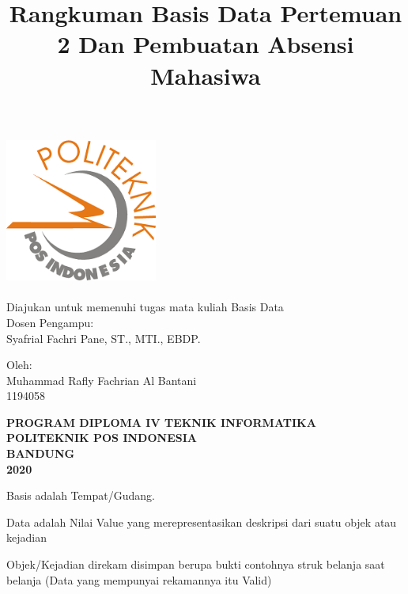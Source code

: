 \documentclass[12pt]{article}
\title{Rangkuman Basis Data Pertemuan 2 Dan Pembuatan Absensi Mahasiwa}
\date{}
\begin{document}
\begin{titlepage}
\maketitle
\thispagestyle{empty}

\vspace{0.5cm}
\begin{center}
\includegraphics[width=5cm, height=5cm]{poltekpos.png}
\end{center}
\vspace{0.5cm}
\begin{center}
Diajukan untuk memenuhi tugas mata kuliah Basis Data\\
\vspace{12px}
Dosen Pengampu:\\
Syafrial Fachri Pane, ST., MTI., EBDP.
\vspace{12px}

Oleh:\\
Muhammad Rafly Fachrian Al Bantani\\
1194058
\vspace{14px}

\textbf{PROGRAM DIPLOMA IV TEKNIK INFORMATIKA}\\
\textbf{POLITEKNIK POS INDONESIA\\}\textbf{BANDUNG}\\
\textbf{2020}
\end{center}
\end{titlepage}


\newpage
\maketitle

Basis adalah Tempat/Gudang.

Data adalah Nilai Value yang merepresentasikan deskripsi dari suatu objek atau kejadian

Objek/Kejadian direkam disimpan berupa bukti contohnya struk belanja saat belanja (Data yang mempunyai rekamannya itu Valid)
\end{document}
